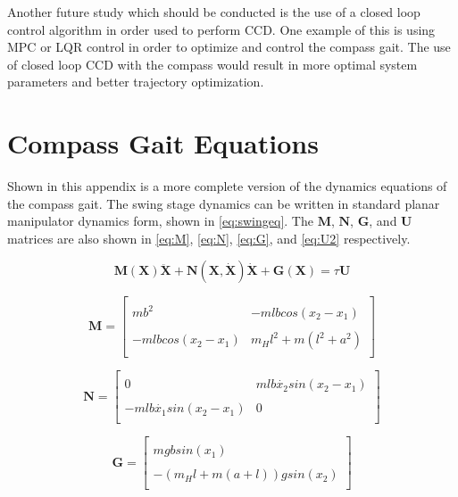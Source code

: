 \documentclass{./springer/svjour3}
\newcommand{\mb}[1]{\mathbf{#1}}
\begin{document}
Another future study which should be conducted is the use of a closed loop control algorithm in order used to perform CCD. One example of this is using 
MPC or LQR control in order to optimize and control the compass gait. The use of closed loop CCD with the compass would result in more optimal system parameters 
and better trajectory optimization. 

\clearpage
\appendix

\section{Compass Gait Equations}

Shown in this appendix is a more complete version of the dynamics equations of the compass gait. The swing stage dynamics can be written in standard planar manipulator 
dynamics form, shown in \ref{eq:swingeq}. The $\mb{M}$, $\mb{N}$, $\mb{G}$, and $\mb{U}$ matrices are also shown in \ref{eq:M}, \ref{eq:N}, \ref{eq:G}, and \ref{eq:U2} respectively.

\begin{equation}
\label{eq:swingeq}
\mb{M(X)}\mb{\ddot{X}} + \mb{N(X, \dot{X})}\mb{\dot{X}} + \mb{G(X)} = \tau\mb{U}
\end{equation}

\begin{equation}
\mb{M} = 
\label{eq:M}
\begin{bmatrix}
\\mb^2 &  -mlbcos(x_2 - x_1)\\
\\-mlbcos(x_2 - x_1) &  m_{H}l^2 + m(l^2 + a^2)\\
\end{bmatrix}
\end{equation}

\begin{equation}
\mb{N} = 
\label{eq:N}
\begin{bmatrix}
\\0 &  mlb\dot{x_2}sin(x_2 - x_1)\\
\\-mlb\dot{x_1}sin(x_2 - x_1) &  0\\
\end{bmatrix}
\end{equation}

\begin{equation}
\mb{G} = 
\label{eq:G}
\begin{bmatrix}
\\mgbsin(x_1)\\
\\-(m_{H}l + m(a+l))gsin(x_2)\\
\end{bmatrix}
\end{equation}
\end{document}
